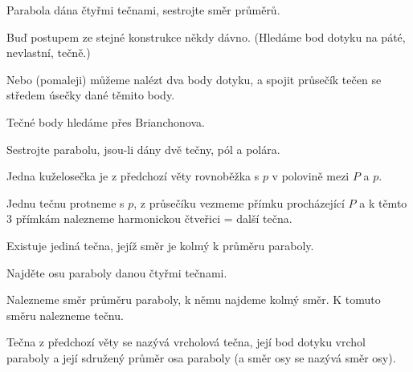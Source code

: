 \documentclass[12pt]{article}					%
\begin{document}
\begin{priklad}[Konstrukce]
	Parabola dána čtyřmi tečnami, sestrojte směr průměrů.

	\begin{reseni}
		Buď postupem ze stejné konstrukce někdy dávno. (Hledáme bod dotyku na páté, nevlastní, tečně.)

		Nebo (pomaleji) můžeme nalézt dva body dotyku, a spojit průsečík tečen se středem úsečky dané těmito body.

		Tečné body hledáme přes Brianchonova.
	\end{reseni}
\end{priklad}

\begin{priklad}[Konstrukce]
	Sestrojte parabolu, jsou-li dány dvě tečny, pól a polára.

	\begin{reseni}
		Jedna kuželosečka je z předchozí věty rovnoběžka s $p$ v polovině mezi $P$ a $p$.

		Jednu tečnu protneme s $p$, z průsečíku vezmeme přímku procházející $P$ a k těmto 3 přímkám nalezneme harmonickou čtveřici = další tečna.
	\end{reseni}
\end{priklad}

\begin{veta}
	Existuje jediná tečna, jejíž směr je kolmý k průměru paraboly.

	\begin{dukazin}[Konstrukcí]
		Najděte osu paraboly danou čtyřmi tečnami.

		Nalezneme směr průměru paraboly, k němu najdeme kolmý směr. K tomuto směru nalezneme tečnu.
	\end{dukazin}
\end{veta}

\begin{definice}
	Tečna z předchozí věty se nazývá vrcholová tečna, její bod dotyku vrchol paraboly a její sdružený průměr osa paraboly (a směr osy se nazývá směr osy).
\end{definice}
\end{document}
